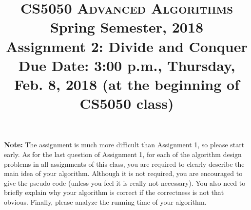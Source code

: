 \documentclass[11pt]{article}
\begin{document}
\baselineskip=14.0pt

\title{CS5050 \textsc{Advanced Algorithms}
\\{\Large Spring Semester, 2018}
\\ Assignment 2: Divide and Conquer
\\ {\large {\bf Due Date: 3:00 p.m.}, Thursday, Feb. 8, 2018 ({\bf at the beginning of CS5050 class})}}
\date{}


\maketitle

\vspace{-0.6in}

\noindent
{\bf Note:} The assignment is much more difficult than Assignment 1, so please start early. As for the last question of Assignment 1, for each of the algorithm design problems in all assignments of this class, you are required to clearly describe the main idea of your algorithm. Although it is not required, you are encouraged to give the pseudo-code (unless you feel it is really not necessary). You also need to briefly explain why your algorithm is correct if the correctness is not that obvious. Finally, please analyze the running time of your algorithm.
\end{document}
